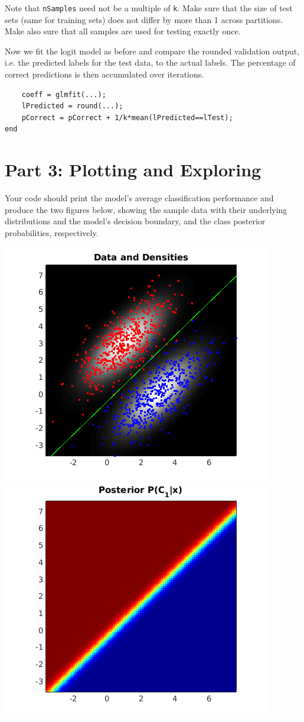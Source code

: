 \documentclass[10pt,a4paper,notitlepage]{report}
\begin{document}
Note that \texttt{nSamples} need not be a multiple of \texttt{k}. Make sure that the size of test sets (same for training sets) does not differ by more than 1 across partitions. Make also sure that all samples are used for testing exactly once.

Now we fit the logit model as before and compare the rounded validation output, i.e. the predicted labels for the test data, to the actual labels. The percentage of correct predictions is then accumulated over iterations.

\begin{verbatim}
    coeff = glmfit(...);
    lPredicted = round(...);
    pCorrect = pCorrect + 1/k*mean(lPredicted==lTest);
end
\end{verbatim}

\section*{Part 3: Plotting and Exploring}
Your code should print the model's average classification performance and produce the two figures below, showing the sample data with their underlying distributions and the model's decision boundary, and the class posterior probabilities, respectively.

\includegraphics[scale=0.6]{p1fig1.png}
\includegraphics[scale=0.6]{p1fig2.png}
\end{document}
